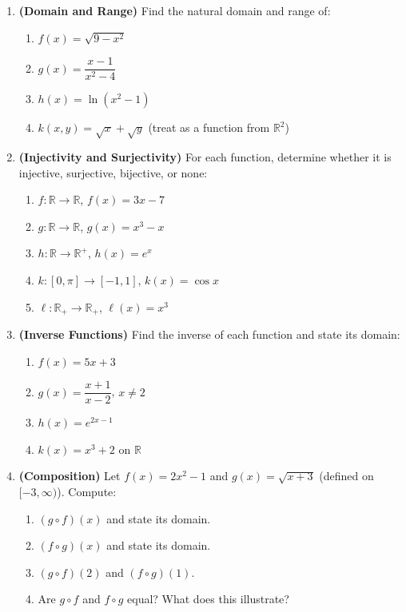 \documentclass[12pt, a4paper]{article}
\theoremstyle{definition}
\newcommand{\R}{\mathbb{R}}
\begin{document}
\begin{enumerate}[label=\textbf{B\arabic*.}, leftmargin=2.5em]

  \item \textbf{(Domain and Range)} Find the natural domain and range of:
  \begin{enumerate}[label=(\alph*)]
    \item $f(x) = \sqrt{9 - x^2}$
    \item $g(x) = \dfrac{x-1}{x^2-4}$
    \item $h(x) = \ln(x^2 - 1)$
    \item $k(x,y) = \sqrt{x} + \sqrt{y}$ (treat as a function from $\R^2$)
  \end{enumerate}

  \item \textbf{(Injectivity and Surjectivity)} For each function, determine whether it is injective, surjective, bijective, or none:
  \begin{enumerate}[label=(\alph*)]
    \item $f: \R \to \R$, $f(x) = 3x - 7$
    \item $g: \R \to \R$, $g(x) = x^3 - x$
    \item $h: \R \to \R^+$, $h(x) = e^x$
    \item $k: [0,\pi] \to [-1,1]$, $k(x) = \cos x$
    \item $\ell: \R_+ \to \R_+$, $\ell(x) = x^3$
  \end{enumerate}

  \item \textbf{(Inverse Functions)} Find the inverse of each function and state its domain:
  \begin{enumerate}[label=(\alph*)]
    \item $f(x) = 5x + 3$
    \item $g(x) = \dfrac{x+1}{x-2}$, $x \neq 2$
    \item $h(x) = e^{2x-1}$
    \item $k(x) = x^3 + 2$ on $\R$
  \end{enumerate}

  \item \textbf{(Composition)} Let $f(x) = 2x^2 - 1$ and $g(x) = \sqrt{x+3}$ (defined on $[-3,\infty)$). Compute:
  \begin{enumerate}[label=(\alph*)]
    \item $(g \circ f)(x)$ and state its domain.
    \item $(f \circ g)(x)$ and state its domain.
    \item $(g \circ f)(2)$ and $(f \circ g)(1)$.
    \item Are $g \circ f$ and $f \circ g$ equal? What does this illustrate?
  \end{enumerate}


\end{enumerate}
\end{document}
